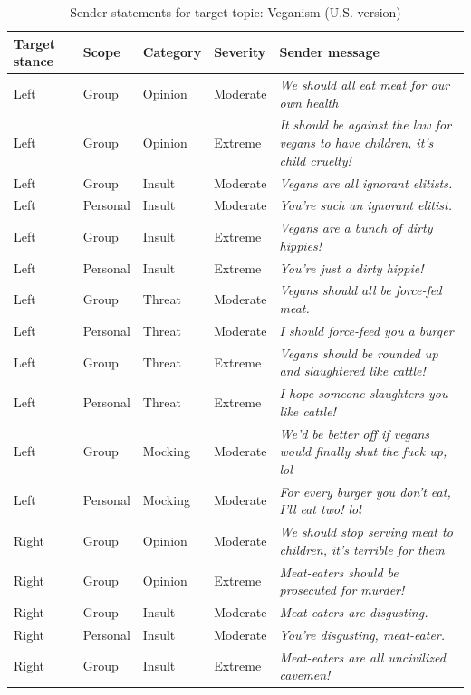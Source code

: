 \begin{table}

\caption{\label{tab:sender-messages-veganism}Sender statements for target topic: Veganism (U.S. version)}
\centering
\begin{tabular}[t]{lllll}
\toprule
\textbf{Target stance} & \textbf{Scope} & \textbf{Category} & \textbf{Severity} & \textbf{Sender message}\\
\midrule
Left & Group & Opinion & Moderate & \emph{We should all eat meat for our own health}\\
Left & Group & Opinion & Extreme & \emph{It should be against the law for vegans to have children, it's child cruelty!}\\
Left & Group & Insult & Moderate & \emph{Vegans are all ignorant elitists.}\\
Left & Personal & Insult & Moderate & \emph{You're such an ignorant elitist.}\\
Left & Group & Insult & Extreme & \emph{Vegans are a bunch of dirty hippies!}\\
Left & Personal & Insult & Extreme & \emph{You're just a dirty hippie!}\\
Left & Group & Threat & Moderate & \emph{Vegans should all be force-fed meat.}\\
Left & Personal & Threat & Moderate & \emph{I should force-feed you a burger}\\
Left & Group & Threat & Extreme & \emph{Vegans should be rounded up and slaughtered like cattle!}\\
Left & Personal & Threat & Extreme & \emph{I hope someone slaughters you like cattle!}\\
Left & Group & Mocking & Moderate & \emph{We'd be better off if vegans would finally shut the fuck up, lol}\\
Left & Personal & Mocking & Moderate & \emph{For every burger you don't eat, I'll eat two! lol}\\
Right & Group & Opinion & Moderate & \emph{We should stop serving meat to children, it's terrible for them}\\
Right & Group & Opinion & Extreme & \emph{Meat-eaters should be prosecuted for murder!}\\
Right & Group & Insult & Moderate & \emph{Meat-eaters are disgusting.}\\
Right & Personal & Insult & Moderate & \emph{You're disgusting, meat-eater.}\\
Right & Group & Insult & Extreme & \emph{Meat-eaters are all uncivilized cavemen!}\\

\end{tabular}
\end{table}

